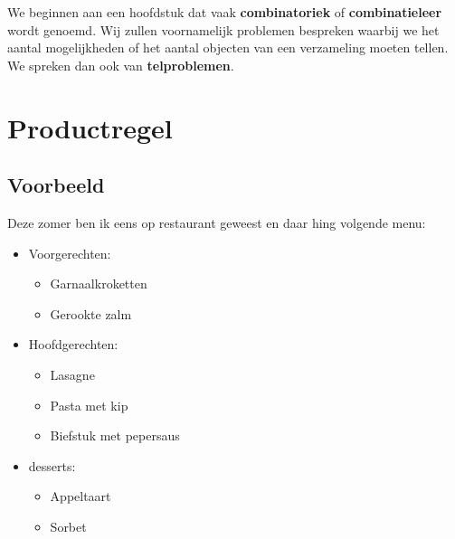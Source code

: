 \documentclass[12pt,a4,twoside]{article}
\begin{document}
{\singlespacing\footnotesize\tableofcontents\thispagestyle{empty}}

\pagebreak
{}

We beginnen aan een hoofdstuk dat vaak {\bf combinatoriek} of {\bf combinatieleer} wordt genoemd. Wij zullen voornamelijk problemen bespreken waarbij we het aantal mogelijkheden of het aantal objecten van een verzameling moeten tellen. We spreken dan ook van {\bf telproblemen}.

\section{Productregel}

\subsection{Voorbeeld}

Deze zomer ben ik eens op restaurant geweest en daar hing volgende menu:

\begin{center}
  \begin{minipage}{0.6\linewidth}
    \begin{mdframed}
      \begin{itemize}
      \item Voorgerechten:
        \begin{itemize}
        \item Garnaalkroketten
        \item Gerookte zalm
        \end{itemize}
      \item Hoofdgerechten:
        \begin{itemize}
        \item Lasagne
        \item Pasta met kip
        \item Biefstuk met pepersaus
        \end{itemize}
      \item desserts:
        \begin{itemize}
        \item Appeltaart
        \item Sorbet
        \end{itemize}
      \end{itemize}
    \end{mdframed}
  \end{minipage}
\end{center}
\end{document}
